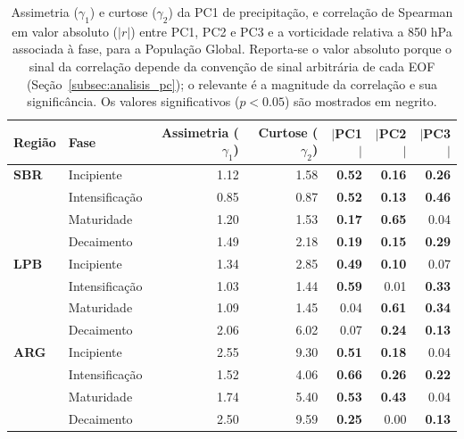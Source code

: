 \begin{table}[htbp]
\centering
\caption[Momentos estatísticos e correlação de PC1--PC3 de precipitação - População Global]
{Assimetria ($\gamma_1$) e curtose ($\gamma_2$) da PC1 de precipitação, e correlação de Spearman em valor absoluto ($|r|$) entre PC1, PC2 e PC3 e a vorticidade relativa a 850 hPa associada à fase, para a População Global. Reporta-se o valor absoluto porque o sinal da correlação depende da convenção de sinal arbitrária de cada EOF (Seção~\ref{subsec:analisis_pc}); o relevante é a magnitude da correlação e sua significância. Os valores significativos ($p<0.05$) são mostrados em negrito.}
\label{tab:stat_global_tp}
\begin{tabular*}{\textwidth}{@{\extracolsep{\fill}}llrrrrr}
\hline
\textbf{Região} & \textbf{Fase} & \textbf{Assimetria ($\gamma_1$)} & \textbf{Curtose ($\gamma_2$)} & \textbf{$|$PC1$|$} & \textbf{$|$PC2$|$} & \textbf{$|$PC3$|$} \\
\hline
\textbf{SBR} & Incipiente       & 1.12 & 1.58 & \textbf{0.52} & \textbf{0.16} & \textbf{0.26} \\
             & Intensificação & 0.85 & 0.87 & \textbf{0.52} & \textbf{0.13} & \textbf{0.46} \\
             & Maturidade         & 1.20 & 1.53 & \textbf{0.17} & \textbf{0.65} & 0.04 \\
             & Decaimento     & 1.49 & 2.18 & \textbf{0.19} & \textbf{0.15} & \textbf{0.29} \\
\hline
\textbf{LPB} & Incipiente       & 1.34 & 2.85 & \textbf{0.49} & \textbf{0.10} & 0.07 \\
             & Intensificação & 1.03 & 1.44 & \textbf{0.59} & 0.01 & \textbf{0.33} \\
             & Maturidade         & 1.09 & 1.45 & 0.04 & \textbf{0.61} & \textbf{0.34} \\
             & Decaimento     & 2.06 & 6.02 & 0.07 & \textbf{0.24} & \textbf{0.13} \\
\hline
\textbf{ARG} & Incipiente       & 2.55 & 9.30 & \textbf{0.51} & \textbf{0.18} & 0.04 \\
             & Intensificação & 1.52 & 4.06 & \textbf{0.66} & \textbf{0.26} & \textbf{0.22} \\
             & Maturidade         & 1.74 & 5.40 & \textbf{0.53} & \textbf{0.43} & 0.04 \\
             & Decaimento     & 2.50 & 9.59 & \textbf{0.25} & 0.00 & \textbf{0.13} \\
\hline
\end{tabular*}
\end{table}
